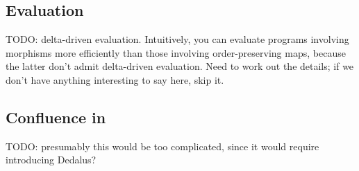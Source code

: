 \subsection{Evaluation}

TODO: delta-driven evaluation. Intuitively, you can evaluate programs involving
morphisms more efficiently than those involving order-preserving maps, because
the latter don't admit delta-driven evaluation. Need to work out the details; if
we don't have anything interesting to say here, skip it.

\subsection{Confluence in \baselang}

TODO: presumably this would be too complicated, since it would require
introducing Dedalus?

